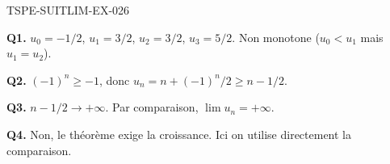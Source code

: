 \begin{corrige}{TSPE-SUITLIM-EX-026}

\textbf{Q1.} $u_0=-1/2$, $u_1=3/2$, $u_2=3/2$, $u_3=5/2$. Non monotone ($u_0<u_1$ mais $u_1=u_2$).

\textbf{Q2.} $(-1)^n \geq -1$, donc $u_n = n+(-1)^n/2 \geq n-1/2$.

\textbf{Q3.} $n-1/2 \to +\infty$. Par comparaison, $\boxed{\lim u_n = +\infty}$.

\textbf{Q4.} Non, le théorème exige la croissance. Ici on utilise directement la comparaison.

\end{corrige}
